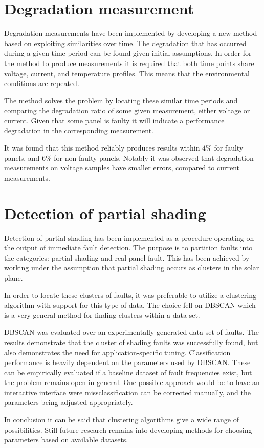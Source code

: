 \section{Degradation measurement}
Degradation measurements have been implemented by developing a new method based on exploiting similarities over time.
The degradation that has occurred during a given time period can be found given initial assumptions.
In order for the method to produce measurements it is required that both time points share voltage, current, and temperature profiles.
This means that the environmental conditions are repeated.

The method solves the problem by locating these similar time periods and comparing the degradation ratio of some given measurement, either voltage or current.
Given that some panel is faulty it will indicate a performance degradation in the corresponding measurement.

It was found that this method reliably produces results within $4\%$ for faulty panels, and $6\%$ for non-faulty panels.
Notably it was observed that degradation measurements on voltage samples have smaller errors, compared to current measurements.

\section{Detection of partial shading}
Detection of partial shading has been implemented as a procedure operating on the output of immediate fault detection.
The purpose is to partition faults into the categories: partial shading and real panel fault.
This has been achieved by working under the assumption that partial shading occurs as clusters in the solar plane.

In order to locate these clusters of faults, it was preferable to utilize a clustering algorithm with support for this type of data.
The choice fell on DBSCAN which is a very general method for finding clusters within a data set.

DBSCAN was evaluated over an experimentally generated data set of faults.
The results demonstrate that the cluster of shading faults was successfully found, but also demonstrates the need for application-specific tuning.
Classification performance is heavily dependent on the parameters used by DBSCAN.
These can be empirically evaluated if a baseline dataset of fault frequencies exist, but the problem remains open in general.
One possible approach would be to have an interactive interface were missclassification can be corrected manually, and the parameters being adjusted appropriately.

In conclusion it can be said that clustering algorithms give a wide range of possibilities.
Still future research remains into developing methods for choosing parameters based on available datasets.





